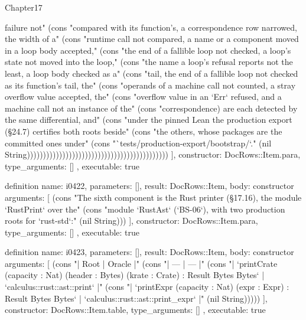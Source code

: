 \begin{lexlean}{Chapter17}
\begin{semanticmodule}
{{failure not" (cons "compared with its function's, a correspondence row narrowed, the width of a" (cons "runtime call not compared, a name or a component moved in a loop body accepted," (cons "the end of a fallible loop not checked, a loop's state not moved into the loop," (cons "the name a loop's refusal reports not the least, a loop body checked as a" (cons "tail, the end of a fallible loop not checked as its function's tail, the" (cons "operands of a machine call not counted, a stray overflow value accepted, the" (cons "overflow value in an `Err` refused, and a machine call not an instance of the" (cons "correspondence) are each detected by the same differential, and" (cons "under the pinned Lean the production export (§24.7) certifies both roots beside" (cons "the others, whose packages are the committed ones under" (cons "`tests/production-export/bootstrap/`." (nil String))))))))))))))))))))))))))))))))))))))))))))
    ],
    constructor: DocRows::Item.para,
    type_arguments: []
  },
  executable: true
}

definition{
  name: i0422,
  parameters: [],
  result: DocRows::Item,
  body: constructor{
    arguments: [
      (cons "The sixth component is the Rust printer (§17.16), the module `RustPrint` over the" (cons "module `RustAst` (`BS-06`), with two production roots for `rust-std`:" (nil String)))
    ],
    constructor: DocRows::Item.para,
    type_arguments: []
  },
  executable: true
}

definition{
  name: i0423,
  parameters: [],
  result: DocRows::Item,
  body: constructor{
    arguments: [
      (cons "| Root | Oracle |" (cons "| --- | --- |" (cons "| `printCrate (capacity : Nat) (header : Bytes) (krate : Crate) : Result Bytes Bytes` | `calculus::rust::ast::print` |" (cons "| `printExpr (capacity : Nat) (expr : Expr) : Result Bytes Bytes` | `calculus::rust::ast::print_expr` |" (nil String)))))
    ],
    constructor: DocRows::Item.table,
    type_arguments: []
  },
  executable: true
}


\end{semanticmodule}
\end{lexlean}

